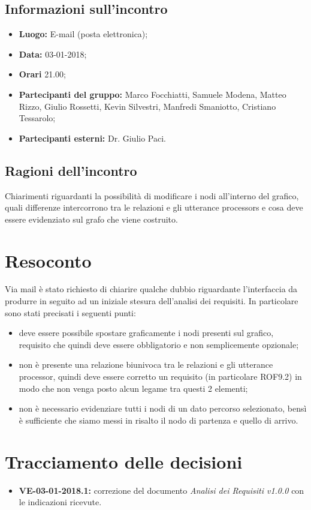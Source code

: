 \documentclass[openany,12pt,a4paper]{article}
\begin{document}
  \subsection{Informazioni sull'incontro} 
   
  \begin{itemize}  
      \item \textbf{Luogo:} E-mail (posta elettronica);
      \item \textbf{Data:} 03-01-2018; 
      \item \textbf{Orari} 21.00;
      \item \textbf{Partecipanti del gruppo:} Marco Focchiatti, Samuele Modena, Matteo Rizzo, Giulio Rossetti, Kevin Silvestri, Manfredi Smaniotto, Cristiano Tessarolo; 
      \item \textbf{Partecipanti esterni:} Dr. Giulio Paci. 
  \end{itemize} 
 
  \subsection{Ragioni dell'incontro} 
  Chiarimenti riguardanti la possibilità di modificare i nodi all'interno del grafico, quali differenze intercorrono tra le relazioni e gli utterance processors e cosa deve essere evidenziato sul grafo che viene costruito. 
 
  \section{Resoconto} 
 
  Via mail è stato richiesto di chiarire qualche dubbio riguardante l'interfaccia da produrre in seguito ad un iniziale stesura dell'analisi dei requisiti. 
  In particolare sono stati precisati i seguenti punti: 

   \begin{itemize} 
    \item deve essere possibile spostare graficamente i nodi presenti sul grafico, requisito che quindi deve essere obbligatorio e non semplicemente opzionale; 
    \item non è presente una relazione biunivoca tra le relazioni e gli utterance processor, quindi deve essere corretto un requisito (in particolare ROF9.2) in modo che non venga posto alcun legame tra questi 2 elementi; 
    \item non è necessario evidenziare tutti i nodi di un dato percorso selezionato, bensì è sufficiente che siamo messi in risalto il nodo di partenza e quello di arrivo. 
  \end{itemize} 
 
  \section{Tracciamento delle decisioni} 
   
  \begin{itemize} 
      \item \textbf{VE-03-01-2018.1:}  
      correzione del documento \textit{Analisi dei Requisiti v1.0.0} con le indicazioni ricevute. 
  \end{itemize} 
   
  
\end{document}
